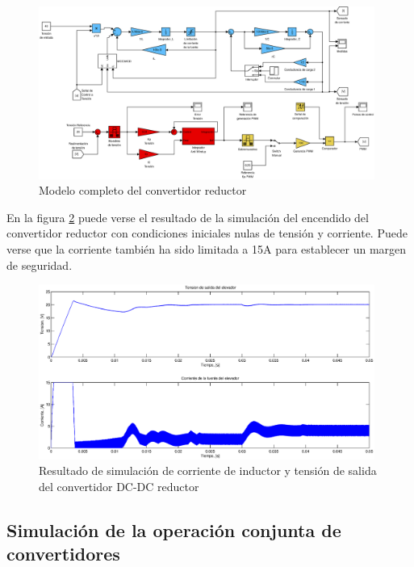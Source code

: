 \begin{figure}[H]
  \centering
  \includegraphics[width=11cm]{gfx/modelo_reductor.eps}
  \caption{Modelo completo del convertidor reductor}
  \label{fig:modelo_reductor}
\end{figure}
En la figura \ref{fig:curvas_reductor} puede verse el resultado de la simulación del encendido del convertidor reductor con condiciones
iniciales nulas de tensión y corriente. Puede verse que la corriente también ha sido limitada a 15A para establecer un margen de seguridad.
\begin{figure}[H]
  \centering
  \includegraphics[width=11cm]{gfx/curvas_reductor.eps}
  \caption{Resultado de simulación de corriente de inductor y tensión de salida del convertidor DC-DC reductor}
  \label{fig:curvas_reductor}
\end{figure}

\subsection{Simulación de la operación conjunta de convertidores}


